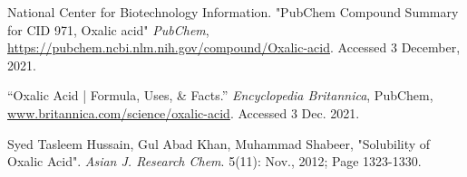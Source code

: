 
\begin{thebibliography}{12}


National Center for Biotechnology Information. "PubChem Compound Summary for CID 971, Oxalic acid" \emph{PubChem}, \url{https://pubchem.ncbi.nlm.nih.gov/compound/Oxalic-acid}. Accessed 3 December, 2021.


“Oxalic Acid | Formula, Uses, & Facts.” \emph{Encyclopedia Britannica}, PubChem, \url{www.britannica.com/science/oxalic-acid}. Accessed 3 Dec. 2021.



Syed Tasleem Hussain, Gul Abad Khan, Muhammad Shabeer, "Solubility of Oxalic Acid". \emph{Asian J. Research Chem}. 5(11): Nov., 2012; Page 1323-1330.























































\end{thebibliography}


